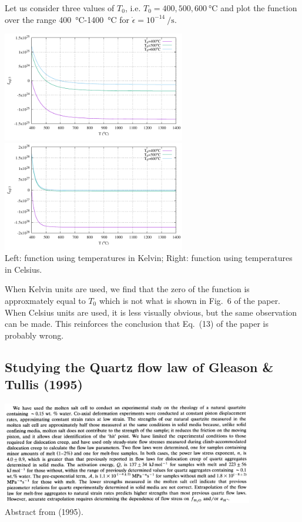 Let us consider three values of $T_0$, i.e. $T_0=400,500,600~\si{\celsius}$ and plot the 
function over the range 400~\si{\celsius}-1400~\si{\celsius} 
for $\dot\epsilon=10^{-14}~\si{\per\second}$.

\begin{center}
\includegraphics[width=8cm]{python_codes/fieldstone_167/feq13/kelvin/lines.pdf}
\includegraphics[width=8cm]{python_codes/fieldstone_167/feq13/zero/lines.pdf}\\
{\captionfont Left: function using temperatures in Kelvin; 
Right: function using temperatures in Celsius.}
\end{center}

When Kelvin units are used, we find that the zero of the function is approxmately equal 
to $T_0$ which is not what is shown in Fig.~6 of the paper. 
When Celsius units are used, it is less visually obvious, but the same observation can be made.
This reinforces the conclusion that Eq.~(13) of the paper is probably wrong. 

 
\newpage
\subsection*{Studying the Quartz flow law of Gleason \& Tullis (1995)}

\begin{center}
\includegraphics[width=11cm]{python_codes/fieldstone_167/images/gltu95}\\
{\captionfont Abstract from \textcite{gltu95} (1995).}
\end{center}

